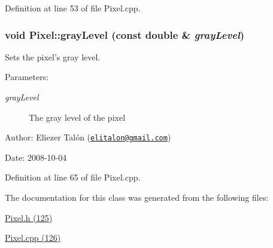 Definition at line 53 of file Pixel.cpp.\hypertarget{class_pixel_5f287c6a53167076bc8f1ce54e74e38d}{
\subsubsection[grayLevel]{\setlength{\rightskip}{0pt plus 5cm}void Pixel::grayLevel (const double \& {\em grayLevel})}}
\label{class_pixel_5f287c6a53167076bc8f1ce54e74e38d}


Sets the pixel's gray level. 

\begin{Desc}
\item[Parameters:]
\begin{description}
\item[{\em grayLevel}]The gray level of the pixel\end{description}
\end{Desc}
\begin{Desc}
\item[Author:]Eliezer Talón (\href{mailto:elitalon@gmail.com}{\tt elitalon@gmail.com}) \end{Desc}
\begin{Desc}
\item[Date:]2008-10-04 \end{Desc}


Definition at line 65 of file Pixel.cpp.

The documentation for this class was generated from the following files:\begin{CompactItemize}
\item 
\hyperlink{_pixel_8h}{Pixel.h (125)}\item 
\hyperlink{_pixel_8cpp}{Pixel.cpp (126)}\end{CompactItemize}
